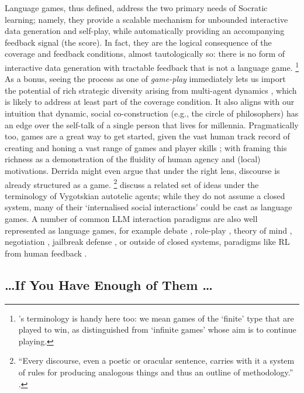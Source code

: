 \documentclass[dvipsnames]{article} %
\begin{document}
Language games, thus defined, address the two primary needs of Socratic learning; namely, they provide a scalable mechanism for unbounded interactive data generation and self-play, while automatically providing an accompanying feedback signal (the score).
In fact, they are the logical consequence of the coverage and feedback conditions, almost tautologically so: there is no form of interactive data generation with tractable feedback that is not a language game.%
\footnote{\citet{carse2011finite}'s terminology is handy here too: we mean games of the `finite' type that are played to win, as distinguished from `infinite games' whose aim is to continue playing.}
As a bonus, seeing the process as one of \emph{game-play} immediately lets us import the potential of rich strategic diversity arising from multi-agent dynamics \citep[as spelled out in depth in][]{leibo2019autocurricula,duenez2023social}, which is likely to address at least part of the coverage condition.
It also aligns with our intuition that dynamic, social co-construction (e.g., the circle of philosophers) has an edge over the self-talk of a single person that lives for millennia.
Pragmatically too, games are a great way to get started, given the vast human track record of creating and honing a vast range of games and player skills \citep{berne1968games};
with \citet{nguyen2020games} framing this richness as a demonstration of the fluidity of human agency and (local) motivations.
Derrida might even argue that under the right lens, discourse is already structured as a game.%
\footnote{``Every discourse, even a poetic or oracular sentence, carries with it a system of rules for producing analogous things and thus an outline of methodology.'' \citep{derrida1995points}.
}
\citet{colas2022language} discuss a related set of ideas under the terminology of Vygotskian autotelic agents; while they do not assume a closed system, many of their `internalised social
interactions' could be cast as language games.
A number of common LLM interaction paradigms are also well represented as language games, for example debate \citep{irving2018ai,liang2023encouraging,du2023improving}, role-play \citep{vezhnevets2023generative},
theory of mind \citep{kim2023fantom},
negotiation \citep{lewis2017deal,meta2022human},
jailbreak defense \citep{zeng2024autodefense}, or outside of closed systems, paradigms like RL from human feedback \citep[RLHF,][]{ouyang2022training,bai2022training,gpt4}.


\subsection*{\ldots If You Have Enough of Them \ldots}
\end{document}
